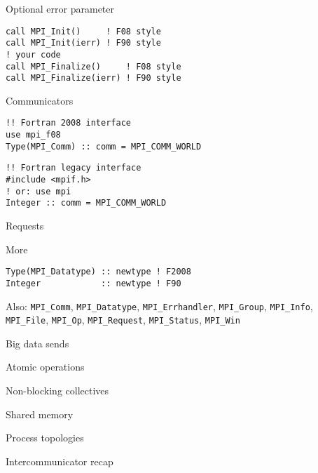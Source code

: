 \documentclass[11pt,headernav]{beamer}
\begin{document}
\begin{frame}[containsverbatim]{Optional error parameter}
\lstset{language=Fortran}
\begin{lstlisting}
call MPI_Init()     ! F08 style
call MPI_Init(ierr) ! F90 style
! your code
call MPI_Finalize()     ! F08 style
call MPI_Finalize(ierr) ! F90 style
\end{lstlisting}
\end{frame}

\begin{frame}[containsverbatim]{Communicators}
\begin{lstlisting}
!! Fortran 2008 interface
use mpi_f08
Type(MPI_Comm) :: comm = MPI_COMM_WORLD
\end{lstlisting}
\begin{lstlisting}
!! Fortran legacy interface
#include <mpif.h>
! or: use mpi
Integer :: comm = MPI_COMM_WORLD
\end{lstlisting}
\end{frame}

\begin{frame}[containsverbatim]{Requests}
\end{frame}

\begin{frame}[containsverbatim]{More}
\begin{lstlisting}
Type(MPI_Datatype) :: newtype ! F2008
Integer            :: newtype ! F90
\end{lstlisting}

Also:
  \lstinline{MPI_Comm}, \lstinline{MPI_Datatype},
  \lstinline{MPI_Errhandler}, \lstinline{MPI_Group},
  \lstinline{MPI_Info}, \lstinline{MPI_File}, \lstinline{MPI_Op},
  \lstinline{MPI_Request}, \lstinline{MPI_Status}, \lstinline{MPI_Win}
\end{frame}

\lstset{language=C}

 {Big data sends}


 {Atomic operations}

%
 
 {Non-blocking collectives}


 {Shared memory}


 {Process topologies}


 {Intercommunicator recap}




\end{document}
